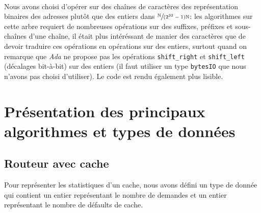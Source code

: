 \documentclass{article}
\begin{document}
\paragraph{}
Nous avons choisi d'opérer sur des chaînes de caractères des représentation binaires des adresses plutôt que des entiers dans $\sfrac{\mathbb{N}}{(2^{32} - 1)\mathbb{N}}$: les algorithmes sur cette arbre requiert de nombreuses opérations sur des suffixes, préfixes et sous-chaînes d'une chaîne, il était plus intéréssant de manier des caractères que de devoir traduire ces opérations en opérations sur des entiers, surtout quand on remarque que \emph{Ada} ne propose pas les opérations \verb|shift_right| et \verb|shift_left| (décalages bit-à-bit) sur des entiers (il faut utiliser un type \verb|bytesIO| que nous n'avons pas choisi d'utiliser). Le code est rendu également plus lisible.


\section{Présentation des principaux algorithmes et types de données}

\subsection{Routeur avec cache}
Pour représenter les statistiques d'un cache, nous avons défini un type de donnée qui contient un entier représentant le nombre de demandes et un entier représentant le nombre de défaults de cache.
\end{document}
